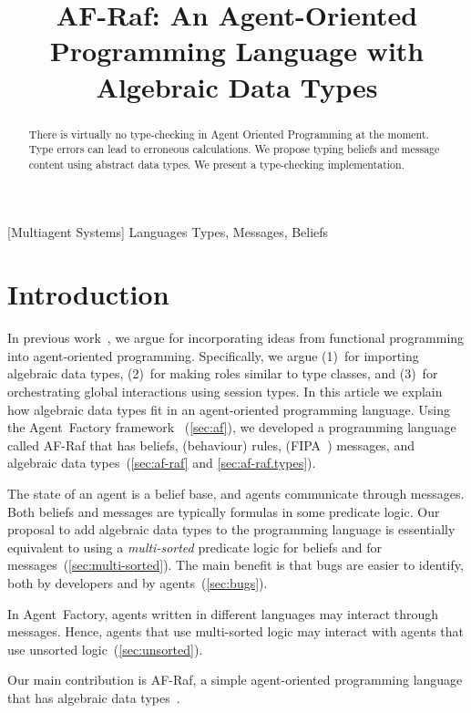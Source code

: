 \documentclass[preprint]{sigplanconf} %
\title{
  AF-Raf: An Agent-Oriented Programming Language with Algebraic Data Types}
\begin{document}
\maketitle
\begin{abstract} %
There is virtually no type-checking in Agent Oriented Programming at the
moment. Type errors can lead to erroneous calculations. We propose typing
beliefs and message content using abstract data types. We present a type-checking implementation.

\end{abstract} %
[Multiagent Systems]
\terms Languages
\keywords Types, Messages, Beliefs

\section{Introduction} %

In previous work~\cite{grigore2011}, we argue for incorporating ideas from
functional programming into agent-oriented programming. Specifically, we
argue (1)~for importing algebraic data types, (2)~for making roles similar
to type classes, and (3)~for orchestrating global interactions using
session types. In this article we explain how algebraic data types fit in
an agent-oriented programming language. Using the Agent~Factory
framework~\cite{russell2011af} (\autoref{sec:af}), we developed a
programming language called AF-Raf that has beliefs, (behaviour) rules,
(FIPA~\cite{poslad2000fipa}) messages, and algebraic data
types~(\autoref{sec:af-raf} and \autoref{sec:af-raf.types}).

The state of an agent is a belief base, and agents communicate through
messages. Both beliefs and messages are typically formulas in some
predicate logic. Our proposal to add algebraic data types to the
programming language is essentially equivalent to using a
\emph{multi-sorted} predicate logic for beliefs and for
messages~(\autoref{sec:multi-sorted}). The main benefit is that bugs are
easier to identify, both by developers and by agents~(\autoref{sec:bugs}).

In Agent~Factory, agents written in different languages may interact
through messages. Hence, agents that use multi-sorted logic may interact
with agents that use unsorted logic~(\autoref{sec:unsorted}).

Our main contribution is AF-Raf, a simple agent-oriented programming
language that has algebraic data types~\cite{site:af-raf}.
\end{document}
